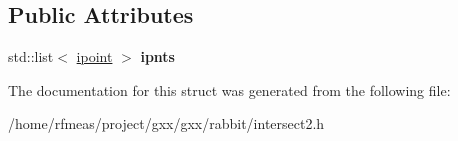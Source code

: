 \subsection*{Public Attributes}
\begin{DoxyCompactItemize}
\item 
std\+::list$<$ \hyperlink{structrabbit_1_1ipoint}{ipoint} $>$ {\bfseries ipnts}\hypertarget{structrabbit_1_1loop__loop__intersection__result_ad02d9abd36069f5fbd1717da119f0c3a}{}\label{structrabbit_1_1loop__loop__intersection__result_ad02d9abd36069f5fbd1717da119f0c3a}

\end{DoxyCompactItemize}


The documentation for this struct was generated from the following file\+:\begin{DoxyCompactItemize}
\item 
/home/rfmeas/project/gxx/gxx/rabbit/intersect2.\+h\end{DoxyCompactItemize}
